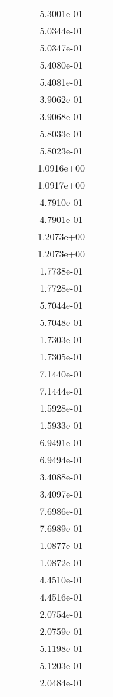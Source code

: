 \begin{xltabular}{\textwidth}{r|rS[table-format=1.3e+2]S[table-format=1.4e+2]S[table-format=1.4e+2]S[table-format=-1.5]}
&  &  & 5.3001e-01 & & \\
&  &  & 5.0344e-01 & & \\
&  &  & 5.0347e-01 & & \\
&  &  & 5.4080e-01 & & \\
&  &  & 5.4081e-01 & & \\
&  &  & 3.9062e-01 & & \\
&  &  & 3.9068e-01 & & \\
&  &  & 5.8033e-01 & & \\
&  &  & 5.8023e-01 & & \\
&  &  & 1.0916e+00 & & \\
&  &  & 1.0917e+00 & & \\
&  &  & 4.7910e-01 & & \\
&  &  & 4.7901e-01 & & \\
&  &  & 1.2073e+00 & & \\
&  &  & 1.2073e+00 & & \\
&  &  & 1.7738e-01 & & \\
&  &  & 1.7728e-01 & & \\
&  &  & 5.7044e-01 & & \\
&  &  & 5.7048e-01 & & \\
&  &  & 1.7303e-01 & & \\
&  &  & 1.7305e-01 & & \\
&  &  & 7.1440e-01 & & \\
&  &  & 7.1444e-01 & & \\
&  &  & 1.5928e-01 & & \\
&  &  & 1.5933e-01 & & \\
&  &  & 6.9491e-01 & & \\
&  &  & 6.9494e-01 & & \\
&  &  & 3.4088e-01 & & \\
&  &  & 3.4097e-01 & & \\
&  &  & 7.6986e-01 & & \\
&  &  & 7.6989e-01 & & \\
&  &  & 1.0877e-01 & & \\
&  &  & 1.0872e-01 & & \\
&  &  & 4.4510e-01 & & \\
&  &  & 4.4516e-01 & & \\
&  &  & 2.0754e-01 & & \\
&  &  & 2.0759e-01 & & \\
&  &  & 5.1198e-01 & & \\
&  &  & 5.1203e-01 & & \\
&  &  & 2.0484e-01 & & \\

\end{xltabular}
